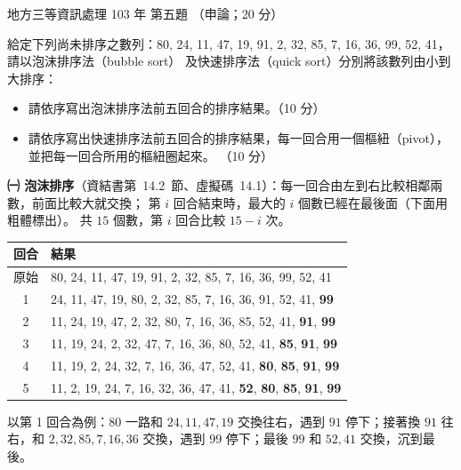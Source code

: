 \begin{pastexam}[label={px:df3-103-ds-05}]{地方三等資訊處理 103 年 第五題}
（申論；20 分）

給定下列尚未排序之數列：80, 24, 11, 47, 19, 91, 2, 32, 85, 7, 16, 36, 99, 52, 41，請以泡沫排序法（bubble sort）
及快速排序法（quick sort）分別將該數列由小到大排序：
\begin{itemize}[leftmargin=2.2em, nosep]
\item[㈠] 請依序寫出泡沫排序法前五回合的排序結果。（10 分）
\item[㈡] 請依序寫出快速排序法前五回合的排序結果，每一回合用一個樞紐（pivot），並把每一回合所用的樞紐圈起來。
（10 分）
\end{itemize}
\end{pastexam}

\begin{pastsoln}
\textbf{㈠ 泡沫排序}（資結書第~14.2~節、虛擬碼~14.1）：每一回合由左到右比較相鄰兩數，前面比較大就交換；
第 $i$ 回合結束時，最大的 $i$ 個數已經在最後面（下面用粗體標出）。 共 $15$ 個數，第 $i$ 回合比較 $15 - i$ 次。
\begin{center}
\small
\begin{tabular}{cl}
\toprule
回合 & 結果 \\
\midrule
原始 & 80, 24, 11, 47, 19, 91, 2, 32, 85, 7, 16, 36, 99, 52, 41 \\
1 & 24, 11, 47, 19, 80, 2, 32, 85, 7, 16, 36, 91, 52, 41, \textbf{99} \\
2 & 11, 24, 19, 47, 2, 32, 80, 7, 16, 36, 85, 52, 41, \textbf{91}, \textbf{99} \\
3 & 11, 19, 24, 2, 32, 47, 7, 16, 36, 80, 52, 41, \textbf{85}, \textbf{91}, \textbf{99} \\
4 & 11, 19, 2, 24, 32, 7, 16, 36, 47, 52, 41, \textbf{80}, \textbf{85}, \textbf{91}, \textbf{99} \\
5 & 11, 2, 19, 24, 7, 16, 32, 36, 47, 41, \textbf{52}, \textbf{80}, \textbf{85}, \textbf{91}, \textbf{99} \\
\bottomrule
\end{tabular}
\end{center}
以第 1 回合為例：$80$ 一路和 $24, 11, 47, 19$ 交換往右，遇到 $91$ 停下；接著換 $91$ 往右，和 $2, 32, 85, 7, 16, 36$
交換，遇到 $99$ 停下；最後 $99$ 和 $52, 41$ 交換，沉到最後。


\end{pastsoln}
